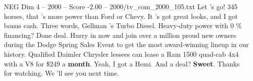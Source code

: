 \begin{textsample}{NEG Dim 4 – 2000 – Score -2.00 – 2000/tv\_com\_2000\_105.txt}  \label{ex:f4_neg_021}
Let 's go! 345 horses, that 's more power than Ford or Chevy.
It 's got great looks, and I got bonus cash.
Three words, Gellman 's Turbo Diesel.
Heavy-duty power with 0 \% financing?
Done deal.
Hurry in now and join over a million proud new owners during the Dodge Spring Sales Event to get the most award-winning lineup in our history.
Qualified Daimler Chrysler lessees can lease a Ram 1500 quad-cab 4x4 with a V8 for \$249 a \textbf{month}.
Yeah, I got a Hemi.
And a deal? \textbf{Sweet}.
Thanks for watching.
We 'll see you next time.

\end{textsample}
